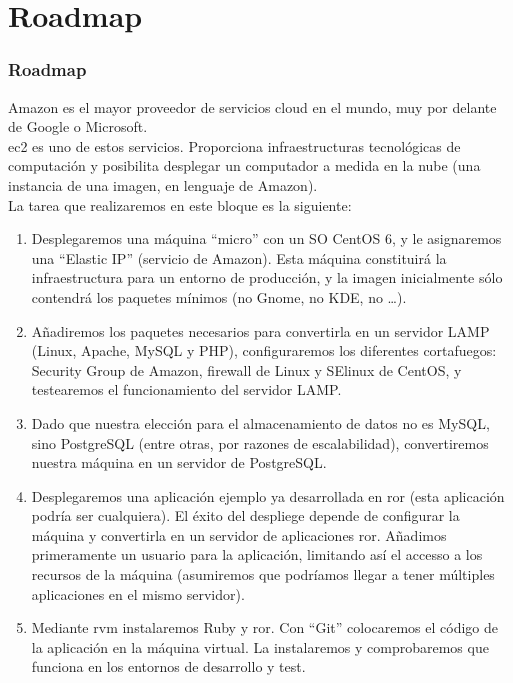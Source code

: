 \documentclass{beamer}
\begin{document}
\section{Roadmap}
\begin{frame}
\frametitle{Roadmap}
Amazon es el mayor proveedor de servicios cloud en el mundo, muy por delante de Google o Microsoft.\\
\acrfull{ec2} es uno de estos servicios. Proporciona infraestructuras tecnológicas de computación y posibilita
desplegar un computador a medida en la nube (una instancia de una imagen, en lenguaje de Amazon).\\

La tarea que realizaremos en este bloque es la siguiente:
\begin{enumerate}
\item Desplegaremos una máquina ``micro'' con un SO CentOS 6, y le asignaremos una ``Elastic IP'' (servicio de Amazon).
Esta máquina constituirá la infraestructura para un entorno de producción, y la imagen inicialmente sólo contendrá 
los paquetes mínimos (no Gnome, no KDE, no \dots).

\item Añadiremos los paquetes necesarios para convertirla en un servidor LAMP (Linux, Apache, MySQL y PHP), configuraremos 
los diferentes cortafuegos: Security Group de Amazon, firewall de Linux y SElinux de CentOS, y
testearemos el funcionamiento del servidor LAMP. 

\item Dado que nuestra elección para el almacenamiento de datos no es MySQL, sino PostgreSQL (entre otras, por  razones de 
escalabilidad), convertiremos nuestra máquina en un servidor de PostgreSQL.

\item Desplegaremos una aplicación ejemplo ya desarrollada en \acrfull{ror} (esta aplicación podría ser cualquiera). 
El éxito del despliege depende de configurar la máquina y convertirla en un servidor de aplicaciones \acrshort{ror}.
Añadimos primeramente un usuario para la aplicación, limitando así el accesso a los recursos de la máquina (asumiremos que
podríamos llegar a tener múltiples aplicaciones en el mismo servidor).

\item Mediante \acrfull{rvm} instalaremos Ruby y \acrshort{ror}. Con ``Git'' colocaremos el código de la aplicación en 
la máquina virtual. La instalaremos y comprobaremos que funciona en los entornos de desarrollo y test.


\end{enumerate}
\end{frame}
\end{document}
